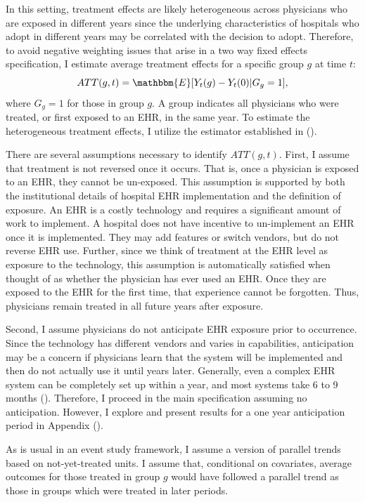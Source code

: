 \documentclass[11pt]{article}
\begin{document}
In this setting, treatment effects are likely heterogeneous across physicians who are exposed in different years since the underlying characteristics of hospitals who adopt in different years may be correlated with the decision to adopt. Therefore, to avoid negative weighting issues that arise in a two way fixed effects specification, I estimate average treatment effects for a specific group $g$ at time $t$: 
$$ATT(g,t)=\mathbbm{E}[Y_t(g)-Y_t(0)|G_g=1],$$
where $G_g=1$ for those in group $g$. A group indicates all physicians who were treated, or first exposed to an EHR, in the same year. To estimate the heterogeneous treatment effects, I utilize the estimator established in \citeauthor{callaway2021difference} (\citeyear{callaway2021difference}).

There are several assumptions necessary to identify $ATT(g,t)$. First, I assume that treatment is not reversed once it occurs. That is, once a physician is exposed to an EHR, they cannot be un-exposed. This assumption is supported by both the institutional details of hospital EHR implementation and the definition of exposure. An EHR is a costly technology and requires a significant amount of work to implement. A hospital does not have incentive to un-implement an EHR once it is implemented. They may add features or switch vendors, but do not reverse EHR use. Further, since we think of treatment at the EHR level as exposure to the technology, this assumption is automatically satisfied when thought of as whether the physician has ever used an EHR. Once they are exposed to the EHR for the first time, that experience cannot be forgotten. Thus, physicians remain treated in all future years after exposure.

Second, I assume physicians do not anticipate EHR exposure prior to occurrence. Since the technology has different vendors and varies in capabilities, anticipation may be a concern if physicians learn that the system will be implemented and then do not actually use it until years later. Generally, even a complex EHR system can be completely set up within a year, and most systems take 6 to 9 months (\cite{uzialko_2021}). Therefore, I proceed in the main specification assuming no anticipation. However, I explore and present results for a one year anticipation period in Appendix (). 

As is usual in an event study framework, I assume a version of parallel trends based on not-yet-treated units. I assume that, conditional on covariates, average outcomes for those treated in group $g$ would have followed a parallel trend as those in groups which were treated in later periods. 
\end{document}
